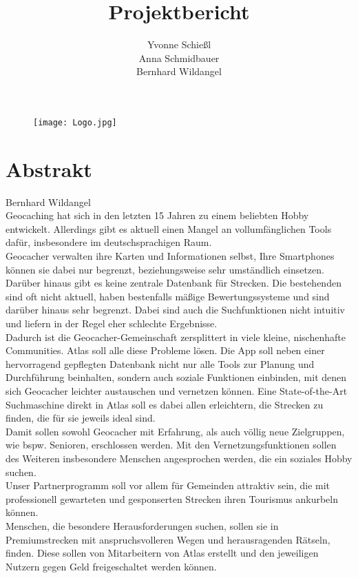 \documentclass[a4paper, 12pt]{article}
\title{\textbf{Projektbericht}}
\author{ Yvonne Schießl \\
		Anna Schmidbauer\\
		Bernhard Wildangel}
\date{}
\begin{document}
\maketitle

\begin{figure}[H] 
	\begin{minipage}{15cm} 
	   \texttt{[image: Logo.jpg]} 
	\end{minipage}
\end{figure}
\newpage

\tableofcontents
\newpage
\section{Abstrakt} Bernhard Wildangel\\
Geocaching hat sich in den letzten 15 Jahren zu einem beliebten Hobby entwickelt.
Allerdings gibt es aktuell einen Mangel an vollumfänglichen Tools dafür, insbesondere im deutschsprachigen Raum.\\
Geocacher verwalten ihre Karten und Informationen selbst, Ihre Smartphones
können sie dabei nur begrenzt, beziehungsweise sehr umständlich einsetzen.\\
Darüber hinaus gibt es keine zentrale Datenbank für Strecken. Die bestehenden sind oft nicht aktuell,
haben bestenfalls mäßige Bewertungssysteme und sind darüber hinaus sehr begrenzt. Dabei sind auch die Suchfunktionen nicht intuitiv und liefern in der Regel eher schlechte Ergebnisse.\\
Dadurch ist die Geocacher-Gemeinschaft zersplittert in viele kleine, nischenhafte Communities.
Atlas soll alle diese Probleme lösen. Die App soll neben einer hervorragend gepflegten Datenbank nicht nur alle Tools zur Planung und Durchführung beinhalten, sondern auch soziale Funktionen einbinden, mit denen sich Geocacher leichter austauschen und vernetzen können. Eine State-of-the-Art Suchmaschine direkt in Atlas soll es dabei allen erleichtern, die Strecken zu finden, die für sie jeweils ideal sind. \\
Damit sollen sowohl Geocacher mit Erfahrung, als auch völlig neue Zielgruppen, wie bspw. Senioren, erschlossen werden. Mit den Vernetzungsfunktionen sollen des Weiteren insbesondere Menschen angesprochen werden, die ein soziales Hobby suchen.\\
Unser Partnerprogramm soll vor allem für Gemeinden attraktiv sein, die mit professionell gewarteten und gesponserten Strecken ihren Tourismus ankurbeln können.\\
Menschen, die besondere Herausforderungen suchen, sollen sie in Premiumstrecken mit anspruchsvolleren Wegen und herausragenden Rätseln, finden. Diese sollen von Mitarbeitern von Atlas erstellt und den jeweiligen Nutzern gegen Geld freigeschaltet werden können.
\end{document}
